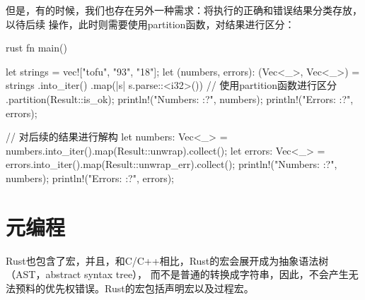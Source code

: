 但是，有的时候，我们也存在另外一种需求：将执行的正确和错误结果分类存放，以待后续
操作，此时则需要使用partition函数，对结果进行区分：
\begin{code-block}{rust}
fn main() {
    let strings = vec!["tofu", "93", "18"];
    let (numbers, errors): (Vec<_>, Vec<_>) = strings
        .into_iter()
        .map(|s| s.parse::<i32>())
        // 使用partition函数进行区分
        .partition(Result::is_ok);
    println!("Numbers: {:?}", numbers);
    println!("Errors: {:?}", errors);

    // 对后续的结果进行解构
    let numbers: Vec<_> = numbers.into_iter().map(Result::unwrap).collect();
    let errors: Vec<_> = errors.into_iter().map(Result::unwrap_err).collect();
    println!("Numbers: {:?}", numbers);
    println!("Errors: {:?}", errors);
}
\end{code-block}

\section{元编程}
Rust也包含了宏，并且，和C/C++相比，Rust的宏会展开成为抽象语法树（AST，abstract syntax tree），
而不是普通的转换成字符串，因此，不会产生无法预料的优先权错误。Rust的宏包括声明宏以及过程宏。
